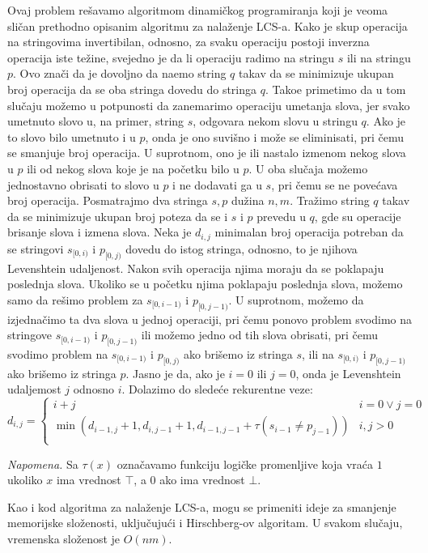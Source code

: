 Ovaj problem re\v savamo algoritmom dinami\v ckog programiranja koji je veoma sli\v can prethodno opisanim algoritmu za nala\v zenje LCS-a. Kako je skup operacija na stringovima invertibilan, odnosno, za svaku operaciju postoji inverzna operacija iste te\v zine, svejedno je da li operaciju radimo na stringu $s$ ili na stringu $p$. Ovo zna\v ci da je dovoljno da na\dj emo string $q$ takav da se minimizuje ukupan broj operacija da se oba stringa dovedu do stringa $q$. Tako\dj e primetimo da u tom slu\v caju mo\v zemo u potpunosti da zanemarimo operaciju umetanja slova, jer svako umetnuto slovo u, na primer, string $s$, odgovara nekom slovu u stringu $q$. Ako je to slovo bilo umetnuto i u $p$, onda je ono suvi\v sno i mo\v ze se eliminisati, pri \v cemu se smanjuje broj operacija. U suprotnom, ono je ili nastalo izmenom nekog slova u $p$ ili od nekog slova koje je na po\v cetku bilo u $p$. U oba slu\v caja mo\v zemo jednostavno obrisati to slovo u $p$ i ne dodavati ga u $s$, pri \v cemu se ne pove\' cava broj operacija. Posmatrajmo dva stringa $s,p$ du\v zina $n,m$. Tra\v zimo string $q$ takav da se minimizuje ukupan broj poteza da se i $s$ i $p$ prevedu u $q$, gde su operacije brisanje slova i izmena slova. Neka je $d_{i,j}$ minimalan broj operacija potreban da se stringovi $s_{[0,i)}$ i $p_{[0,j)}$ dovedu do istog stringa, odnosno, to je njihova Levenshtein udaljenost. Nakon svih operacija njima moraju da se poklapaju poslednja slova. Ukoliko se u po\v cetku njima poklapaju poslednja slova, mo\v zemo samo da re\v simo problem za $s_{[0,i-1)}$ i $p_{[0,j-1)}$. U suprotnom, mo\v zemo da izjedna\v cimo ta dva slova u jednoj operaciji, pri \v cemu ponovo problem svodimo na stringove $s_{[0,i-1)}$ i $p_{[0,j-1)}$ ili mo\v zemo jedno od tih slova obrisati, pri \v cemu svodimo problem na $s_{[0,i-1)}$ i $p_{[0,j)}$ ako bri\v semo iz stringa $s$, ili na $s_{[0,i)}$ i $p_{[0,j-1)}$ ako bri\v semo iz stringa $p$. Jasno je da, ako je $i=0$ ili $j=0$, onda je Levenshtein udaljemost $j$ odnosno $i$. Dolazimo do slede\' ce rekurentne veze:
\begin{equation}
    d_{i,j} = \begin{cases}
        i+j & i=0 \vee j=0 \\
        \min(d_{i-1,j}+1, d_{i,j-1}+1, d_{i-1,j-1}+\tau(s_{i-1} \not = p_{j-1})) & i,j > 0 \\
    \end{cases}
\end{equation}

\textit{Napomena.} Sa $\tau(x)$ ozna\v cavamo funkciju logi\v cke promenljive koja vra\' ca $1$ ukoliko $x$ ima vrednost $\top$, a $0$ ako ima vrednost $\bot$.

\noindent
\begin{minipage}[l]{\textwidth}

\end{minipage}

Kao i kod algoritma za nala\v zenje LCS-a, mogu se primeniti ideje za smanjenje memorijske slo\v zenosti, uklju\v cuju\' ci i Hirschberg-ov algoritam. U svakom slu\v caju, vremenska slo\v zenost je $O(nm)$.